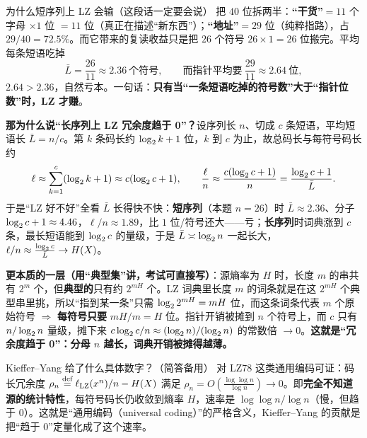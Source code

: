 \documentclass[11pt,a4paper]{ctexart}
\begin{document}
\begin{idea}{为什么短序列上 LZ 会输（这段话一定要会说）}
把 $40$ 位拆两半：\textbf{“干货”}$=11$ 个字母 $\times1$ 位 $=11$ 位（真正在描述“新东西”）；\textbf{“地址”}$=29$ 位（纯粹指路），占 $29/40=72.5\%$。而它带来的复读收益只是把 $26$ 个符号 $26\times1=26$ 位搬完。平均每条短语吃掉
\[
\bar L=\frac{26}{11}\approx2.36\ \text{个符号},\qquad\text{而指针平均要}\ \frac{29}{11}\approx2.64\ \text{位},
\]
$2.64>2.36$，自然亏本。一句话：\textbf{只有当“一条短语吃掉的符号数”大于“指针位数”时，LZ 才赚}。
\end{idea}

\textbf{那为什么说“长序列上 LZ 冗余度趋于 0”？}设序列长 $n$、切成 $c$ 条短语，平均短语长 $\bar L=n/c$。第 $k$ 条码长约 $\log_{2} k+1$ 位，$k$ 到 $c$ 为止，故总码长与每符号码长约
\[
\ell\approx\sum_{k=1}^{c}(\log_{2} k+1)\approx c(\log_{2} c+1),
\qquad
\frac{\ell}{n}\approx\frac{c(\log_{2} c+1)}{n}=\frac{\log_{2} c+1}{\bar L}.
\]
于是“LZ 好不好”全看 $\bar L$ 长得快不快：\textbf{短序列}（本题 $n=26$）时 $\bar L\approx2.36$、分子 $\log_{2} c+1\approx4.46$，$\ell/n\approx1.89$，比 $1$ 位/符号还大——亏；\textbf{长序列}时词典涨到 $c$ 条，最长短语能到 $\log_{2} c$ 的量级，于是 $\bar L\asymp\log_{2} n$ 一起长大，$\ell/n\approx\frac{\log_{2} c}{\bar L}\to H\!\left(X\right)$。

\textbf{更本质的一层（用“典型集”讲，考试可直接写）}：源熵率为 $H$ 时，长度 $m$ 的串共有 $2^{m}$ 个，但\textbf{典型的}只有约 $2^{mH}$ 个。LZ 词典里长度 $m$ 的词条就是在这 $2^{mH}$ 个典型串里挑，所以“指到某一条”只需 $\log_{2}2^{mH}=mH$ 位，而这条词条代表 $m$ 个原始符号 $\Rightarrow$ \textbf{每符号只要} $mH/m=H$ 位。指针开销被摊到 $n$ 个符号上，而 $c$ 只有 $n/\log_{2} n$ 量级，摊下来 $c\log_{2} c/n\approx(\log_{2} n)/(\log_{2} n)$ 的常数倍 $\to0$。\textbf{这就是“冗余度趋于 0”：分母 $n$ 越长，词典开销被摊得越薄。}

\begin{qa}{Kieffer--Yang 给了什么具体数字？（简答备用）}
对 LZ78 这类通用编码可证：码长冗余度
$\rho_n\overset{\text{def}}{=}\ell_{\text{LZ}}(x^n)/n-H\!\left(X\right)$
满足 $\rho_n=O\!\left(\frac{\log\log n}{\log n}\right)\to0$。即\textbf{完全不知道源的统计特性}，每符号码长仍收敛到熵率 $H$，速率是 $\log\log n/\log n$（慢，但趋于 $0$）。这就是“通用编码（universal coding）”的严格含义，Kieffer--Yang 的贡献是把“趋于 $0$”定量化成了这个速率。
\end{qa}
\end{document}

